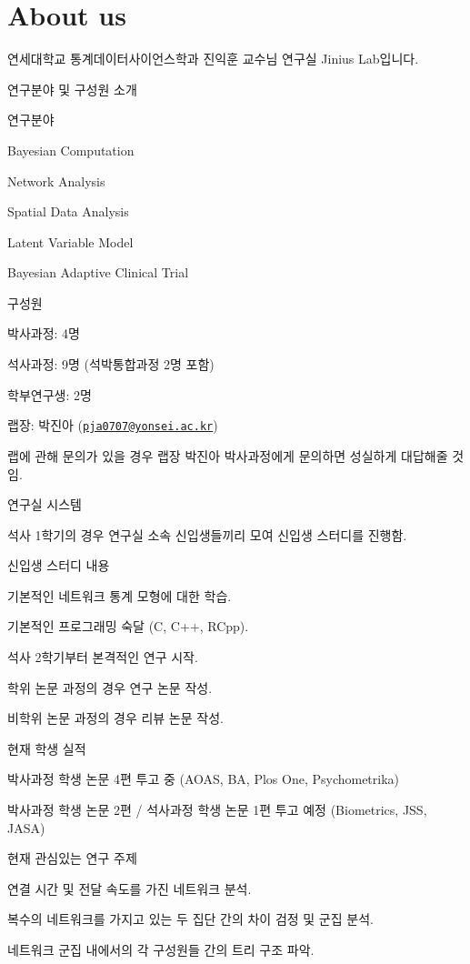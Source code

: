 \documentclass[
]{book}
\author{}
\date{\vspace{-2.5em}}
\begin{document}
{
\setcounter{tocdepth}{1}
\tableofcontents
}
\hypertarget{about-us}{%
\chapter*{About us}\label{about-us}}

연세대학교 통계데이터사이언스학과 진익훈 교수님 연구실 Jinius Lab입니다.

연구분야 및 구성원 소개

연구분야

Bayesian Computation

Network Analysis

Spatial Data Analysis

Latent Variable Model

Bayesian Adaptive Clinical Trial

구성원

박사과정: 4명

석사과정: 9명 (석박통합과정 2명 포함)

학부연구생: 2명

랩장: 박진아 (\href{mailto:pja0707@yonsei.ac.kr}{\nolinkurl{pja0707@yonsei.ac.kr}})

랩에 관해 문의가 있을 경우 랩장 박진아 박사과정에게 문의하면
성실하게 대답해줄 것임.

연구실 시스템

석사 1학기의 경우 연구실 소속 신입생들끼리 모여 신입생 스터디를
진행함.

신입생 스터디 내용

기본적인 네트워크 통계 모형에 대한 학습.

기본적인 프로그래밍 숙달 (C, C++, RCpp).

석사 2학기부터 본격적인 연구 시작.

학위 논문 과정의 경우 연구 논문 작성.

비학위 논문 과정의 경우 리뷰 논문 작성.

현재 학생 실적

박사과정 학생 논문 4편 투고 중 (AOAS, BA, Plos One,
Psychometrika)

박사과정 학생 논문 2편 / 석사과정 학생 논문 1편 투고 예정
(Biometrics, JSS, JASA)

현재 관심있는 연구 주제

연결 시간 및 전달 속도를 가진 네트워크 분석.

복수의 네트워크를 가지고 있는 두 집단 간의 차이 검정 및 군집 분석.

네트워크 군집 내에서의 각 구성원들 간의 트리 구조 파악.
\end{document}
